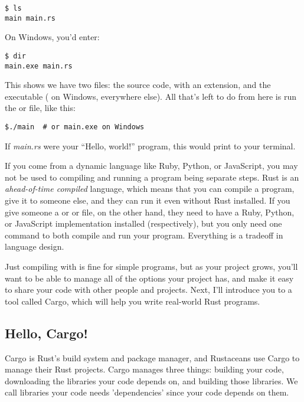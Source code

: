 \begin{verbatim}
$ ls
main main.rs 
\end{verbatim}

On Windows, you'd enter:

\begin{verbatim}
$ dir
main.exe main.rs  
\end{verbatim}

This shows we have two files: the source code, with an  extension, and the executable ( on Windows, 
 everywhere else). All that's left to do from here is run the  or  file, like this:

\begin{verbatim}
$./main  # or main.exe on Windows  
\end{verbatim}

If \emph{main.rs} were your \enquote{Hello, world!} program, this would print  to your terminal.

\blank

If you come from a dynamic language like Ruby, Python, or JavaScript, you may not be used to compiling and running a program 
being separate steps. Rust is an \emph{ahead-of-time compiled} language, which means that you can compile a program, give it 
to someone else, and they can run it even without Rust installed. If you give someone a  or  or  
file, on the other hand, they need to have a Ruby, Python, or JavaScript implementation installed (respectively), but you only 
need one command to both compile and run your program. Everything is a tradeoff in language design.

\blank

Just compiling with  is fine for simple programs, but as your project grows, you'll want to be able to manage all 
of the options your project has, and make it easy to share your code with other people and projects. Next, I'll introduce you 
to a tool called Cargo, which will help you write real-world Rust programs.

\subsection{Hello, Cargo!}

Cargo is Rust's build system and package manager, and Rustaceans use Cargo to manage their Rust projects. Cargo manages 
three things: building your code, downloading the libraries your code depends on, and building those libraries. We call 
libraries your code needs 'dependencies' since your code depends on them.

